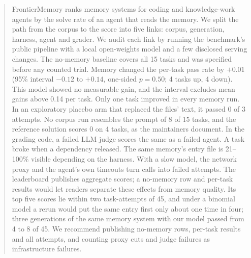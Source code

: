 \begin{abstract}
FrontierMemory ranks memory systems for coding and knowledge-work agents by the solve rate of an agent that reads the memory.
We split the path from the corpus to the score into five links: corpus, generation, harness, agent and grader.
We audit each link by running the benchmark's public pipeline with a local open-weights model and a few disclosed serving changes. The no-memory baseline covers all 15 tasks and was specified before any counted trial.
Memory changed the per-task pass rate by $+0.01$ (95\% interval $-0.12$ to $+0.14$, one-sided $p=0.50$; 4 tasks up, 4 down). This model showed no measurable gain, and the interval excludes mean gains above 0.14 per task. Only one task improved in every memory run. In an exploratory placebo arm that replaced the files' text, it passed 0 of 3 attempts.
No corpus run resembles the prompt of 8 of 15 tasks, and the reference solution scores 0 on 4 tasks, as the maintainers document. In the grading code, a failed LLM judge scores the same as a failed agent. A task broke when a dependency released. The same memory's entry file is 21--100\% visible depending on the harness. With a slow model, the network proxy and the agent's own timeouts turn calls into failed attempts.
The leaderboard publishes aggregate scores; a no-memory row and per-task results would let readers separate these effects from memory quality. Its top five scores lie within two task-attempts of 45, and under a binomial model a rerun would put the same entry first only about one time in four; three generations of the same memory system with our model passed from 4 to 8 of 45.
We recommend publishing no-memory rows, per-task results and all attempts, and counting proxy cuts and judge failures as infrastructure failures.
\end{abstract}
